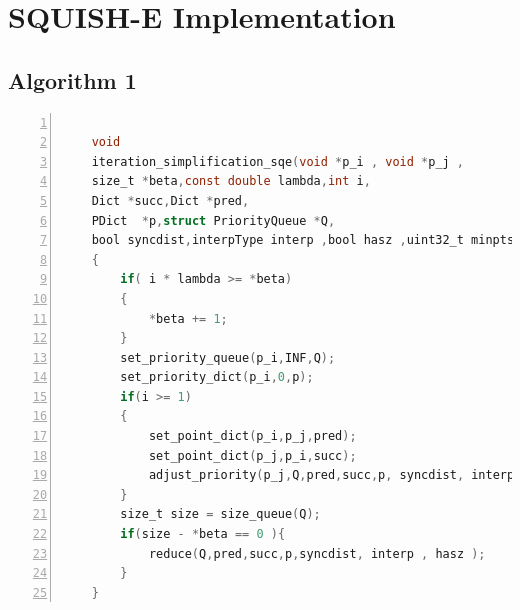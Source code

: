 \documentclass[twoside,12pt, a4paper]{report}
\begin{document}
\section{SQUISH-E Implementation}


\subsection{Algorithm 1}

\begin{lstlisting}[language=C, % Spécifie le langage du code
	caption={SQUISH-E}, % Légende du listing
	label=lst:squish_c, % Étiquette pour référencer le listing
	numbers=left, 
	numberstyle=\tiny\color{gray}, 
	stepnumber=1, 
	frame=single,
	breaklines=true, 
	postbreak=\mbox{\textcolor{red}{$\hookrightarrow$}\space},
	showstringspaces=false 
	]
	
	void
	iteration_simplification_sqe(void *p_i , void *p_j ,
	size_t *beta,const double lambda,int i,
	Dict *succ,Dict *pred,
	PDict  *p,struct PriorityQueue *Q,
	bool syncdist,interpType interp ,bool hasz ,uint32_t minpts)
	{
		if( i * lambda >= *beta)
		{
			*beta += 1;
		}
		set_priority_queue(p_i,INF,Q);
		set_priority_dict(p_i,0,p);
		if(i >= 1)
		{
			set_point_dict(p_i,p_j,pred);
			set_point_dict(p_j,p_i,succ);
			adjust_priority(p_j,Q,pred,succ,p, syncdist, interp , hasz );
		}
		size_t size = size_queue(Q);
		if(size - *beta == 0 ){
			reduce(Q,pred,succ,p,syncdist, interp , hasz );
		}
	}
\end{lstlisting}
\end{document}
